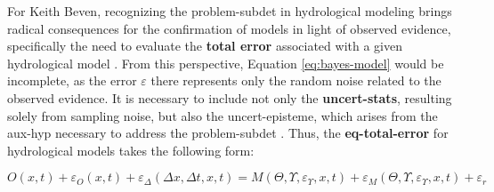 \documentclass[./main_en.tex]{subfiles}
\begin{document}
\par For Keith Beven, recognizing the \gls{problem-subdet} in hydrological modeling brings radical consequences for the confirmation of models in light of observed evidence, specifically the need to evaluate the \textbf{total error} associated with a given hydrological \gls{model} \cite{Beven2005}. From this perspective, Equation \eqref{eq:bayes-model} would be incomplete, as the error $\varepsilon$ there represents only the random noise related to the observed evidence. It is necessary to include not only the \textbf{\gls{uncert-stats}}, resulting solely from sampling noise, but also the \gls{uncert-episteme}, which arises from the \gls{aux-hyp} necessary to address the \gls{problem-subdet} \cite{Beven2016}. Thus, the \textbf{\gls{eq-total-error}} for hydrological models takes the following form:
\begin{linenomath*}
\begin{equation}
\label{eq:total-error}
    O(x, t) + \varepsilon_{O}(x, t) + \varepsilon_{\Delta}(\Delta x,\Delta t, x, t) = M(\Theta, \Upsilon, \varepsilon_{\Upsilon}, x, t) + \varepsilon_{M}(\Theta, \Upsilon, \varepsilon_{\Upsilon}, x, t) + \varepsilon_r
\end{equation}
\end{linenomath*}
\end{document}
